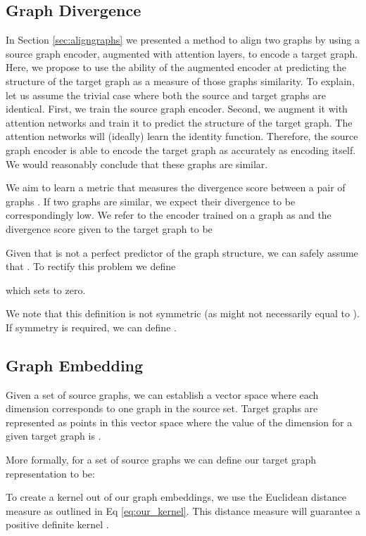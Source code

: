 \documentclass[sigconf]{acmart}
\begin{document}
\subsection{Graph Divergence}
\label{sec:div}
In Section \ref{sec:aligngraphs} we presented a method to align two graphs by using a source graph encoder, augmented with attention layers, to encode a target graph.
Here, we propose to use the ability of the augmented encoder at predicting the structure of the target graph as a measure of those graphs similarity.
To explain, let us assume the trivial case where both the source and target graphs are identical.
First, we train the source graph encoder.
Second, we augment it with attention networks and train it to predict the structure of the target graph.
The attention networks will (ideally) learn the identity function.
Therefore, the source graph encoder is able to encode the target graph as accurately as encoding itself.
We would reasonably conclude that these graphs are similar.

We aim to learn a metric that measures the divergence score between a pair of graphs .
If two graphs are similar, we expect their divergence to be correspondingly low.
We refer to the encoder trained on a graph  as  and the divergence score given to the target graph  to be  



\noindent Given that  is not a perfect predictor of the graph  structure, we can safely assume that .
To rectify this problem we define

which sets  to zero.

We note that this definition is not symmetric (as  might not necessarily equal to ).
If symmetry is required, we can define .

\subsection{Graph Embedding}
Given a set of source graphs, we can establish a vector space where each dimension corresponds to one graph in the source set.
Target graphs are represented as points in this vector space where the value of the  dimension for a given target graph  is .

More formally, for a set of  source graphs we can define our target graph representation to be:


\noindent To create a kernel out of our graph embeddings, we use the Euclidean distance measure as outlined in Eq \ref{eq:our_kernel}.
This distance measure will guarantee a positive definite kernel \cite{haasdonk2004learning,wu2018d2ke}.
\end{document}
